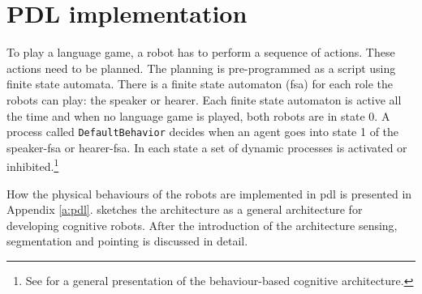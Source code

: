 \section{PDL implementation}

\enlargethispage{1\baselineskip}
To play a language game, a robot has to perform a sequence of actions. These actions need to be planned. The planning is pre-programmed as a script using finite state automata. There is a finite state automaton ({\sc fsa}) for each role the robots can play: the speaker or hearer. Each finite state automaton is active all the time and when no language game is played, both robots are in state 0. A process called \texttt{DefaultBehavior} decides when an agent goes into state 1 of the speaker-{\sc fsa} or hearer-{\sc fsa}. In each state a set of dynamic processes is activated or inhibited.\footnote{See  for a general presentation of the behaviour-based cognitive architecture.}

How the physical behaviours of the robots are implemented in {\sc pdl} is presented in Appendix \ref{a:pdl}.  sketches the architecture as a general architecture for developing cognitive robots. After the introduction of the architecture sensing, segmentation and pointing is discussed in detail.

